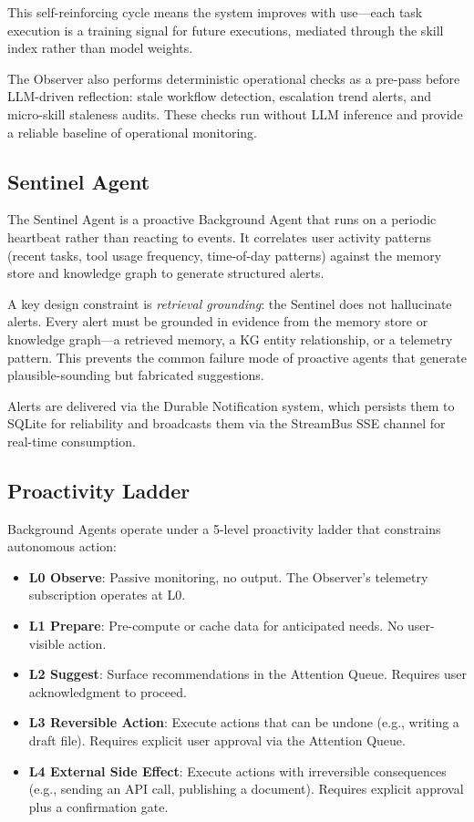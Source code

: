 \documentclass{article}
\begin{document}
This self-reinforcing cycle means the system improves with use---each task execution is a training signal for future executions, mediated through the skill index rather than model weights.

The Observer also performs deterministic operational checks as a pre-pass before LLM-driven reflection: stale workflow detection, escalation trend alerts, and micro-skill staleness audits.
These checks run without LLM inference and provide a reliable baseline of operational monitoring.

\subsection{Sentinel Agent}
\label{sec:sentinel_agent}

The Sentinel Agent is a proactive Background Agent that runs on a periodic heartbeat rather than reacting to events.
It correlates user activity patterns (recent tasks, tool usage frequency, time-of-day patterns) against the memory store and knowledge graph to generate structured alerts.

A key design constraint is \emph{retrieval grounding}: the Sentinel does not hallucinate alerts.
Every alert must be grounded in evidence from the memory store or knowledge graph---a retrieved memory, a KG entity relationship, or a telemetry pattern.
This prevents the common failure mode of proactive agents that generate plausible-sounding but fabricated suggestions.

Alerts are delivered via the Durable Notification system, which persists them to SQLite for reliability and broadcasts them via the StreamBus SSE channel for real-time consumption.

\subsection{Proactivity Ladder}
\label{sec:proactivity_ladder}

Background Agents operate under a 5-level proactivity ladder that constrains autonomous action:

\begin{itemize}[leftmargin=*]
\item \textbf{L0 Observe}: Passive monitoring, no output. The Observer's telemetry subscription operates at L0.
\item \textbf{L1 Prepare}: Pre-compute or cache data for anticipated needs. No user-visible action.
\item \textbf{L2 Suggest}: Surface recommendations in the Attention Queue. Requires user acknowledgment to proceed.
\item \textbf{L3 Reversible Action}: Execute actions that can be undone (e.g., writing a draft file). Requires explicit user approval via the Attention Queue.
\item \textbf{L4 External Side Effect}: Execute actions with irreversible consequences (e.g., sending an API call, publishing a document). Requires explicit approval plus a confirmation gate.
\end{itemize}
\end{document}
